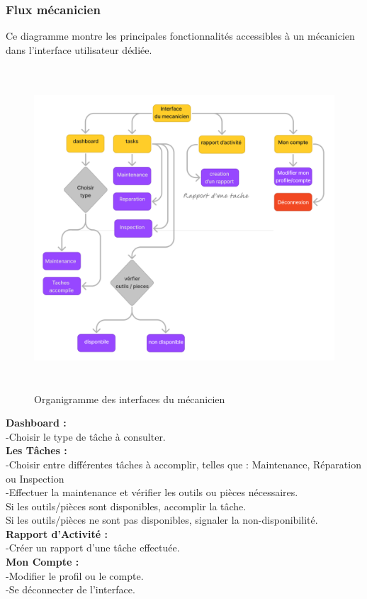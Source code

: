 \newpage
\subsubsection{Flux mécanicien}
Ce diagramme montre les principales fonctionnalités accessibles à un mécanicien dans l'interface utilisateur dédiée.\\
\begin{figure}[htbp]
  \centering
  \includegraphics[width=1\textwidth,height=12cm]{chap2.images/org mecanicien.png}
  \caption{Organigramme des interfaces  du mécanicien}
\end{figure}
\newline
\noindent
\textbf{Dashboard :}\\
-Choisir le type de tâche à consulter.\\
\textbf{Les Tâches :}\\
-Choisir entre différentes tâches à accomplir, telles que : Maintenance, Réparation ou Inspection\\
-Effectuer la maintenance et vérifier les outils ou pièces nécessaires.\\
Si les outils/pièces sont disponibles, accomplir la tâche.\\
Si les outils/pièces ne sont pas disponibles, signaler la non-disponibilité.\\
\textbf{Rapport d'Activité :}\\
-Créer un rapport d'une tâche effectuée.\\
\textbf{Mon Compte :}\\
-Modifier le profil ou le compte.\\
-Se déconnecter de l'interface.\\

